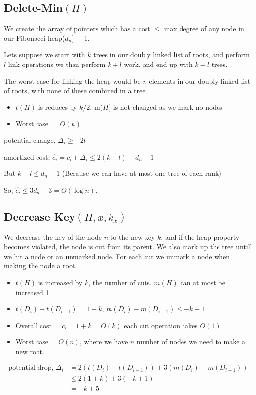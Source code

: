 \documentclass[a4paper,oneside,11pt]{article}
\begin{document}
\subsection*{Delete-Min$(H)$}
We create the array of pointers which has a cost $\leq$ max degree of any node in our Fibonacci heap($d_n$) + 1.

Lets suppose we start with $k$ trees in our doubly linked list of roots, and perform $l$ link operations we then perform $k+l$ work, and end up with $k-l$ trees.

The worst case for linking the heap would be $n$ elements in our doubly-linked list of roots, with none of these combined in a tree.
\begin{itemize}
\item{$t(H)$ is reduces by $k/2$, m($H$) is not changed as we mark no nodes}
\item{Worst case} $= O(n)$
\end{itemize}

potential change, $\Delta_i \geq -2l$

amortized cost, $\hat{c_i} = c_i + \Delta_i \leq 2(k - l) + d_n + 1$

But $k - l\leq d_n + 1$ (Because we can have at most one tree of each rank)

So, $\hat{c_i}\leq 3d_n + 3 = O(\log n)$.

\subsection*{Decrease Key$(H, x, k_x)$}
We decrease the key of the node $n$ to the new key $k$, and if the heap property becomes violated, the node is cut from its parent.
We also mark up the tree untill we hit a node or an unmarked node. For each cut we unmark a node when making the node a root.
\begin{itemize}
\item{$t(H)$ is increased by $k$, the number of cuts. $m(H)$ can at most be increased 1}
\item{$t(D_i)-t(D_{i-1}) = 1 + k$, $m(D_i)-m(D_{i-1})\leq -k+1$}
\item{Overall cost} = $c_i = 1 + k = O(k)$ each cut operation takes $O(1)$
\item{Worst case} = $O(n)$, where we have $n$ number of nodes we need to make a new root.
\end{itemize}

\begin{align*}
\text{potential drop, } \Delta_i &= 2(t(D_i)-t(D_{i-1}))+3(m(D_i)-m(D_{i-1}))\\
&\leq 2(1+k)+3(-k+1)\\
&= -k+5
\end{align*}
\end{document}
